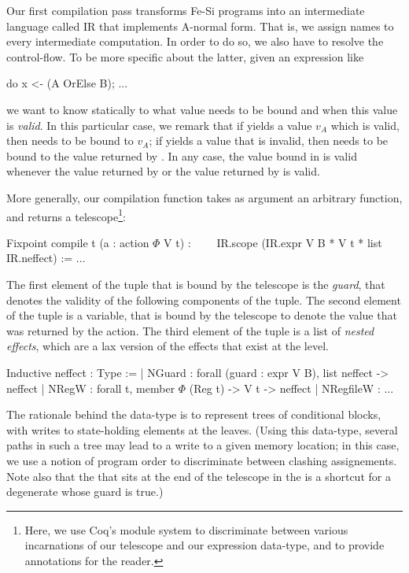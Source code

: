 \documentclass[preprint]{sigplanconf}
\begin{document}
Our first compilation pass transforms Fe-Si programs into an
intermediate language called IR that implements A-normal form. That
is, we assign names to every intermediate computation.
%
In order to do so, we also have to resolve the control-flow. To be
more specific about the latter, given an expression like
\begin{coq}
do x <- (A OrElse B); ... 
\end{coq}
we want to know statically to what value  needs to be bound
and when this value is \emph{valid}. 
%
In this particular case, we remark that if  yields a value
$v_A$ which is valid, then  needs to be bound to $v_A$; if
 yields a value that is invalid, then  needs to be
bound to the value returned by . In any case, the value bound
in  is valid whenever the value returned by  or the
value returned by  is valid.

More generally, our compilation function takes as argument an
arbitrary function, and returns a telescope\footnote{Here, we use
  Coq's module system to discriminate between various incarnations of
  our telescope and our expression data-type, and to provide
  annotations for the reader.}:
\begin{coq}
Fixpoint compile t (a : action $\Phi$ V t) : 
$\qquad$IR.scope (IR.expr V B * V t * list IR.neffect) := ...
\end{coq}
The first element of the tuple that is bound by the
telescope is the \emph{guard}, that denotes the validity of the
following components of the tuple.
%
The second element of the tuple is a variable, that is bound by the
telescope to denote the value that was returned by the action. 
%
The third element of the tuple is a list of \emph{nested effects},
which are a lax version of the effects that exist at the 
level.
\begin{coq}
Inductive neffect  : Type :=
| NGuard : forall (guard : expr V B), list neffect -> neffect 
| NRegW : forall t, member $\Phi$ (Reg t) -> V t -> neffect
| NRegfileW : ... 
\end{coq}
The rationale behind the  data-type is to represent
trees of conditional blocks, with writes to state-holding elements at
the leaves. (Using this data-type, several paths in such a tree may
lead to a write to a given memory location; in this case, we use a
notion of program order to discriminate between clashing
assignements. Note also that the  that sits at the
end of the telescope in the  is a shortcut for a
degenerate  whose guard is true.)
\end{document}
